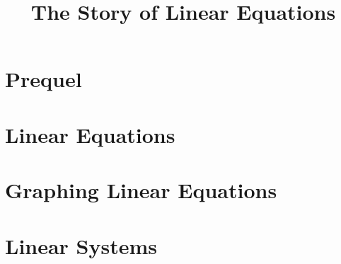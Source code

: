 \documentclass{book}
\title{The Story of Linear Equations}
\begin{document}
\titlepage

\tableofcontents

\pagebreak

\part{Prequel}



\part{Linear Equations}



\part{Graphing Linear Equations}


\part{Linear Systems}



\end{document}
